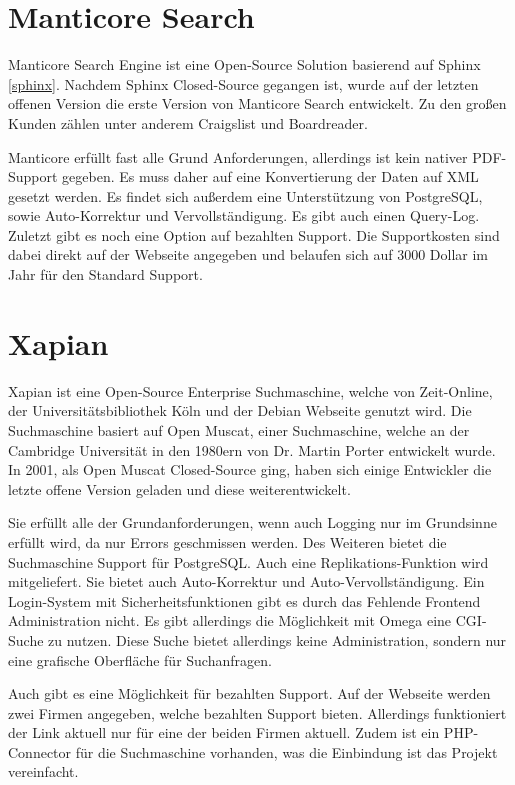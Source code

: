 \cite{Elasticsearch.2019}

\section{Manticore Search}

Manticore Search Engine ist eine Open-Source Solution basierend auf Sphinx \ref{sphinx}. Nachdem Sphinx Closed-Source gegangen ist, wurde auf der letzten offenen Version die erste Version von Manticore Search entwickelt. Zu den großen Kunden zählen unter anderem Craigslist und Boardreader.

Manticore erfüllt fast alle Grund Anforderungen, allerdings ist kein nativer PDF-Support gegeben. Es muss daher auf eine Konvertierung der Daten auf XML gesetzt werden. Es findet sich außerdem eine Unterstützung von PostgreSQL, sowie Auto-Korrektur und Vervollständigung. Es gibt auch einen Query-Log. Zuletzt gibt es noch eine Option auf bezahlten Support. Die Supportkosten sind dabei direkt auf der Webseite angegeben und belaufen sich auf 3000 Dollar im Jahr für den Standard Support. 

\cite{ManticoreSoftwareLtd.2019}


\section{Xapian}

Xapian ist eine Open-Source Enterprise Suchmaschine, welche von Zeit-Online, der Universitätsbibliothek Köln und der Debian Webseite genutzt wird. Die Suchmaschine basiert auf Open Muscat, einer Suchmaschine, welche an der Cambridge Universität in den 1980ern von Dr. Martin Porter entwickelt wurde. In 2001, als Open Muscat Closed-Source ging, haben sich einige Entwickler die letzte offene Version geladen und diese weiterentwickelt.

Sie erfüllt alle der Grundanforderungen, wenn auch Logging nur im Grundsinne erfüllt wird, da nur Errors geschmissen werden. Des Weiteren bietet die Suchmaschine Support für PostgreSQL. Auch eine Replikations-Funktion wird mitgeliefert. Sie bietet auch Auto-Korrektur und Auto-Vervollständigung. Ein Login-System mit Sicherheitsfunktionen gibt es durch das Fehlende Frontend Administration nicht. Es gibt allerdings die Möglichkeit mit Omega eine CGI-Suche zu nutzen. Diese Suche bietet allerdings keine Administration, sondern nur eine grafische Oberfläche für Suchanfragen.

Auch gibt es eine Möglichkeit für bezahlten Support. Auf der Webseite werden zwei Firmen angegeben, welche bezahlten Support bieten. Allerdings funktioniert der Link aktuell nur für eine der beiden Firmen aktuell. Zudem ist ein PHP-Connector für die Suchmaschine vorhanden, was die Einbindung ist das Projekt vereinfacht.

